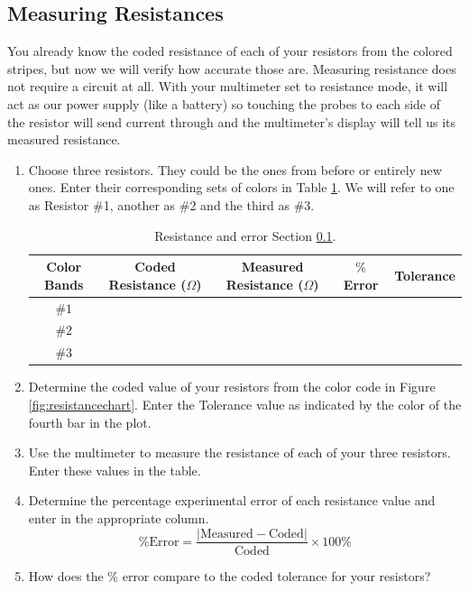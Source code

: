 \subsection{Measuring Resistances}
\label{sec:resist}
You already know the coded resistance of each of your resistors from the colored stripes, but now we will verify how accurate those are. Measuring resistance does not require a circuit at all. With your multimeter set to resistance mode, it will act as our power supply (like a battery) so touching the probes to each side of the resistor will send current through and the multimeter's display will tell us its measured resistance.\myskip

\begin{enumerate}
	\item Choose three resistors. They could be the ones from before or entirely new ones. Enter their corresponding sets of colors in Table \ref{tab:resistance}. We will refer to one as Resistor \#1, another as \#2 and the third as \#3.

	\begin{table}
		\begin{center}
			\begin{tabular}{| c | c | c | c | c |}
				\hline
				Color Bands & Coded Resistance ($\Omega$) & Measured Resistance ($\Omega$) & $\%$ Error & Tolerance \\
				\hline
				$\#1$ & & & & \\
				\hline
				$\#2$ & & & & \\
				\hline
				$\#3$ & & & & \\
				\hline
			\end{tabular}
		\end{center}
		\caption{Resistance and error Section \ref{sec:resist}.}
		\label{tab:resistance}
	\end{table}

	\item Determine the coded value of your resistors from the color code in Figure \ref{fig:resistancechart}. Enter the Tolerance value as indicated by the color of the fourth bar in the plot.

	\item Use the multimeter to measure the resistance of each of your three resistors. Enter these values in the table.

	\item Determine the percentage experimental error of each resistance value and enter in the appropriate column.
	\begin{equation}
		\text{\% Error} = \frac{|\text{Measured} - \text{Coded}|}{\text{Coded}} \times 100\%
	\end{equation}

	\item How does the \% error compare to the coded tolerance for your resistors?

\end{enumerate}

